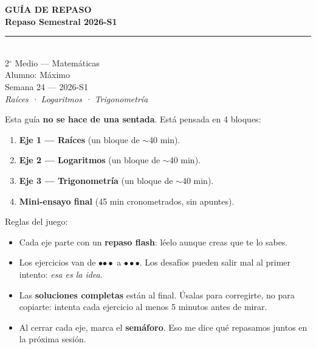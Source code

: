 \documentclass[11pt,a4paper]{article}
\newcommand{\gr}{\ensuremath{^{\circ}}}
\newcommand{\guiaTitulo}{Repaso Semestral}
\newcommand{\guiaSubtitulo}{Raíces · Logaritmos · Trigonometría}
\newcommand{\guiaCurso}{2\gr{} Medio --- Matemáticas}
\newcommand{\guiaAlumno}{Máximo}
\newcommand{\guiaSemana}{Semana 24}
\newcommand{\guiaSemestre}{2026-S1}
\newcounter{ejercicio}
\begin{document}
\thispagestyle{empty}
\vspace*{2cm}
\begin{center}
  {\Huge\bfseries\color{azulprincipal} GUÍA DE REPASO}\\[8pt]
  {\LARGE\bfseries\color{azuloscuro} \guiaTitulo{} \guiaSemestre}\\[15pt]
  {\color{azulprincipal}\rule{8cm}{2pt}}\\[15pt]
  {\Large \guiaCurso}\\[8pt]
  {\large Alumno: \guiaAlumno}\\[4pt]
  {\large \guiaSemana{} --- \guiaSemestre}\\[20pt]
  {\itshape\color{gray} \guiaSubtitulo}
\end{center}

\vspace{1cm}
\begin{tcolorbox}[recuerda, title={\color{black} CÓMO USAR ESTA GUÍA (léelo, son 30 segundos)}]
Esta guía \textbf{no se hace de una sentada}. Está pensada en 4 bloques:
\begin{enumerate}[nosep]
  \item \textbf{Eje 1 --- Raíces} (un bloque de $\sim$40 min).
  \item \textbf{Eje 2 --- Logaritmos} (un bloque de $\sim$40 min).
  \item \textbf{Eje 3 --- Trigonometría} (un bloque de $\sim$40 min).
  \item \textbf{Mini-ensayo final} (45 min cronometrados, sin apuntes).
\end{enumerate}
Reglas del juego:
\begin{itemize}[nosep]
  \item Cada eje parte con un \textbf{repaso flash}: léelo aunque creas que te lo sabes.
  \item Los ejercicios van de {\color{verdedif}$\bullet$}{\color{grisborde}$\bullet\bullet$} a {\color{rojo}$\bullet\bullet\bullet$}. Los desafíos pueden salir mal al primer intento: \emph{esa es la idea}.
  \item Las \textbf{soluciones completas} están al final. Úsalas para corregirte, no para copiarte: intenta cada ejercicio al menos 5 minutos antes de mirar.
  \item Al cerrar cada eje, marca el \textbf{semáforo}. Eso me dice qué repasamos juntos en la próxima sesión.
\end{itemize}
\end{tcolorbox}
\end{document}
